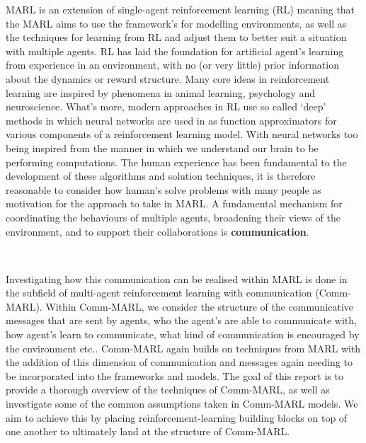 \documentclass{article}
\begin{document}
MARL is an extension of single-agent reinforcement learning (RL) \citep{sutton2018reinforcement} meaning that the MARL aims to use the framework's for modelling environments, as well as the techniques for learning from RL and adjust them to better suit a situation with multiple agents. RL has laid the foundation for artificial agent's learning from experience in an environment, with no (or very little) prior information about the dynamics or reward structure. Many core ideas in reinforcement learning are inspired by phenomena in animal learning, psychology and neuroscience. \citep{subramanian2020psychological} What's more, modern approaches in RL use so called `deep' methods \citep{wang2024deep} in which neural networks are used in as function approximators for various components of a reinforcement learning model. With neural networks too being inspired from the manner in which we understand our brain to be performing computations. The human experience has been fundamental to the development of these algorithms and solution techniques, it is therefore reasonable to consider how human's solve problems with many people as motivation for the approach to take in MARL. A fundamental mechanism for coordinating the behaviours of multiple agents, broadening their views of the environment, and to support their collaborations is \textbf{communication}. \citep{zhu2024survey}

\

Investigating how this communication can be realised within MARL is done in the subfield of multi-agent reinforcement learning with communication (Comm-MARL). Within Comm-MARL, we consider the structure of the communicative messages that are sent by agents, who the agent's are able to communicate with, how agent's learn to communicate, what kind of communication is encouraged by the environment etc.. Comm-MARL again builds on techniques from MARL with the addition of this dimension of communication and messages again needing to be incorporated into the frameworks and models. The goal of this report is to provide a thorough overview of the techniques of Comm-MARL, as well as investigate some of the common assumptions taken in Comm-MARL models. We aim to achieve this by placing reinforcement-learning building blocks on top of one another to ultimately land at the structure of Comm-MARL.

\
\end{document}

